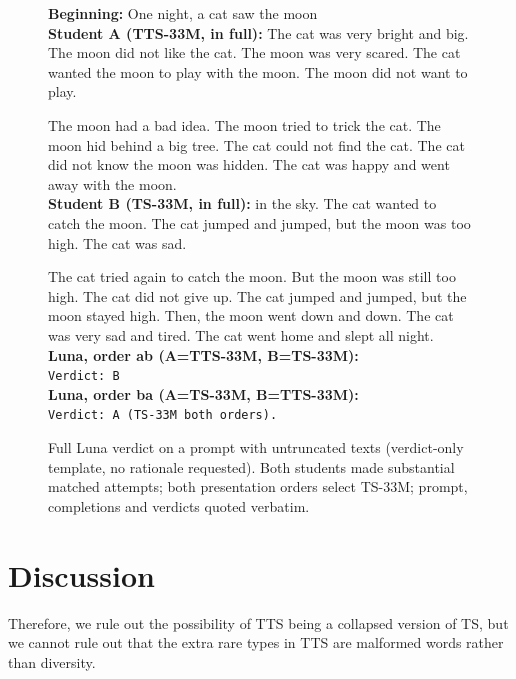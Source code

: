 \documentclass{article}
\newif\ifmarkup
\DeclareRobustCommand{\del}[1]{\ifmarkup\sout{#1}\fi}
\begin{document}
\begin{figure}[H]
  \centering
  \begin{tcolorbox}[storybox, title={Luna judgement call}]
    \textbf{Beginning:} One night, a cat saw the moon \\[4pt]
    \textbf{Student A (TTS-33M, in full):} The cat was very bright and big. The moon did not like the cat. The moon was very scared. The cat wanted the moon to play with the moon. The moon did not want to play.

    The moon had a bad idea. The moon tried to trick the cat. The moon hid behind a big tree. The cat could not find the cat. The cat did not know the moon was hidden. The cat was happy and went away with the moon. \\[4pt]
    \textbf{Student B (TS-33M, in full):} in the sky. The cat wanted to catch the moon. The cat jumped and jumped, but the moon was too high. The cat was sad.

    The cat tried again to catch the moon. But the moon was still too high. The cat did not give up. The cat jumped and jumped, but the moon stayed high. Then, the moon went down and down. The cat was very sad and tired. The cat went home and slept all night. \\[4pt]
    \textbf{Luna, order ab (A=TTS-33M, B=TS-33M):} \\
    \texttt{Verdict: B} \\[4pt]
    \textbf{Luna, order ba (A=TS-33M, B=TTS-33M):} \\
    \texttt{Verdict: A (TS-33M both orders).}
  \end{tcolorbox}
  \caption{Full Luna verdict on a prompt with untruncated texts (verdict-only template, no rationale requested). Both students made substantial matched attempts; both presentation orders select TS-33M; prompt, completions and verdicts quoted verbatim.}
  \label{fig:luna-example}
\end{figure}


\section{Discussion}
Therefore, we rule out the possibility of TTS being a collapsed version of TS, but we cannot rule out that the extra rare types in TTS are malformed words rather than diversity.

\del{Overall, the results suggest that models trained on TTS are competitive with the released TS models in terms of held-out loss. However, given that Eldan \& Li did not include comprehensive documentation of the training process of the released models, we cannot rule out that differences in training hyperparameters may have contributed to the observed differences in loss. Furthermore, loss does not measure qualitative generation quality. To address this, we evaluated the models using GPT-Eval and Elo.}
\end{document}
